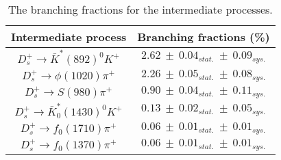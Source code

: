 {    \begin{table}[htbp]
        \caption{The branching fractions for the intermediate processes.}
        \label{inter-processes}
        \begin{center}
            \begin{tabular}{cc}
                \toprule\toprule
                Intermediate process & Branching fractions (\%)\\
                \hline
                $D_{s}^{+} \rightarrow \bar{K}^{*}(892)^{0}K^{+}$               & $2.62\ \pm\ 0.04_{stat.}\ \pm\ 0.09_{sys.}$  \\
                $D_{s}^{+} \rightarrow \phi(1020)\pi^{+}$                       & $2.26\ \pm\ 0.05_{stat.}\ \pm\ 0.08_{sys.}$  \\
                $D_{s}^{+} \rightarrow S(980)\pi^{+}$                           & $0.90\ \pm\ 0.04_{stat.}\ \pm\ 0.11_{sys.}$  \\
                $D_{s}^{+} \rightarrow \bar{K}^{*}_{0}(1430)^{0}K^{+}$          & $0.13\ \pm\ 0.02_{stat.}\ \pm\ 0.05_{sys.}$  \\
                $D_{s}^{+} \rightarrow f_{0}(1710)\pi^{+}$                      & $0.06\ \pm\ 0.01_{stat.}\ \pm\ 0.01_{sys.}$  \\
                $D_{s}^{+} \rightarrow f_{0}(1370)\pi^{+}$                      & $0.06\ \pm\ 0.01_{stat.}\ \pm\ 0.01_{sys.}$  \\
                \bottomrule\bottomrule
            \end{tabular}
        \end{center}
    \end{table}



}
